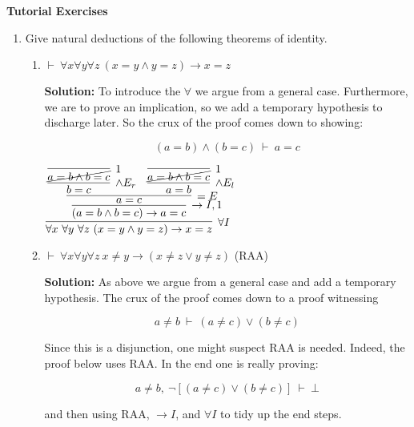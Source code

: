 \documentclass[11pt]{report}
\begin{document}
\newpage
{\bf Tutorial Exercises}
\begin{enumerate}

	\item Give natural deductions of the following theorems of identity.
	
	\begin{enumerate}
		\item $\vdash \ \forall x \forall y \forall z \ (x = y \land y = z) \to x = z$
		
		{\bf Solution:}	To introduce the $\forall$ we argue from a general case. Furthermore, we are to prove an implication, so we add a temporary hypothesis to discharge later. So the crux of the proof comes down to showing: 

		$$(a=b)\land(b=c) \ \vdash \ a=c$$

		\begin{mdframed}
			\begin{center}
				$\infer[\forall I]{\forall x \ \forall y \ \forall z \ (x=y \land y=z) \to x = z}
					{\infer[\to I,1]{(a=b \land b=c) \to a=c}
						{\infer[=E]{a = c}
							{\infer[\land E_{r}]{b = c}
							{\infer[1]{\cancel{a=b \land b=c}}
								{}}
							&
							\infer[\land E_{l}]{a = b}
								{\infer[1]{\cancel{a=b \land b=c}}
									{}}}}}$
			\end{center}
		\end{mdframed}
		
		\item $\vdash \ \forall x \forall y \forall z \ x \neq y \to (x \neq z \lor y \neq z)$ \hspace{5cm} (RAA)
		
		{\bf Solution:}	As above we argue from a general case and add a temporary hypothesis. The crux of the proof comes down to a proof witnessing

		$$a \neq b \ \vdash \ (a \neq c) \lor (b \neq c)$$

		Since this is a disjunction, one might suspect RAA is needed. Indeed, the proof below uses RAA. In the end one is really proving: 

		$$a \neq b, \  \lnot[(a \neq c) \lor (b \neq c)] \ \vdash \ \bot$$

		and then using RAA, $\to I$, and $\forall I$ to tidy up the end steps. 


\end{enumerate}
\end{enumerate}
\end{document}
